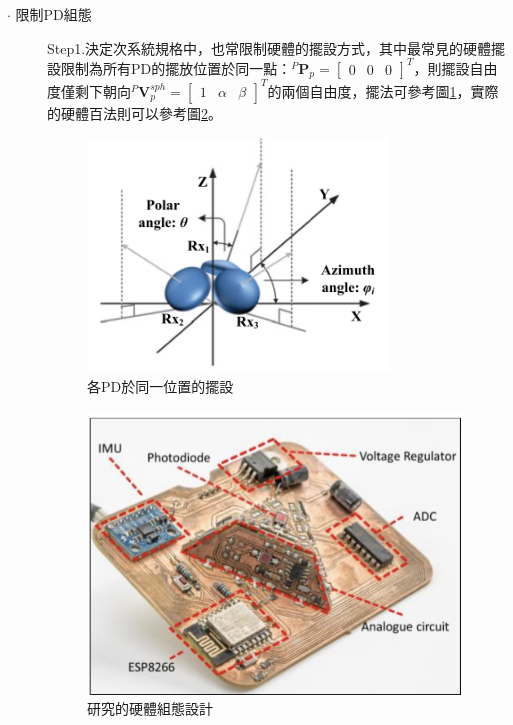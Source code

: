 \begin{description}
        \item[$\cdot$ 限制PD組態]\hfill
        
        \qquad
        Step1.決定次系統規格中，也常限制硬體的擺設方式，其中最常見的硬體擺設限制為所有PD的擺放位置於同一點：$^P\boldsymbol{P}_p=
        \left[\begin{array}{ccc}0&0&0\end{array}\right]^T$，則擺設自由度僅剩下朝向$^P\boldsymbol{V}_p^{sph} = \left[\begin{array}{ccc}1&\alpha&\beta\end{array}\right]^T$的兩個自由度，擺法可參考圖\ref{pic:config_orient}，實際的硬體百法則可以參考圖\ref{pic:ml_pd_config}\cite{case:ml}。
        
        \begin{figure}[htpb]
            \centering
            \includegraphics[width=8cm]{ch2pic/config_orient.png}
            \caption{各PD於同一位置的擺設\cite{case:3d_layers}}
            \label{pic:config_orient}
        \end{figure}

        \begin{figure}[htpb]
            \centering
            \includegraphics[width=10cm]{ch2pic/ml_pd_config.png}
            \caption{\cite{case:ml}研究的硬體組態設計}
            \label{pic:ml_pd_config}
        \end{figure}


\end{description}
